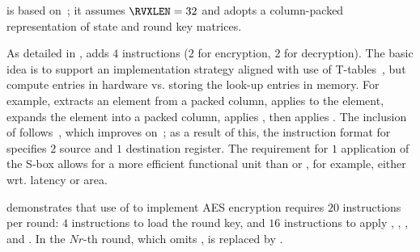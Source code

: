 
is based on~\cite{NadIkeKur:04,BBFR:06,Saarinen:20}; it
assumes 
$\RVXLEN = 32$
and adopts a 
column-packed 
representation of state and round key matrices.

As detailed in
,
adds
$ 4$
instructions ($2$ for encryption, $2$ for decryption).
The basic idea is to support an implementation strategy aligned with use
of 
T-tables~\cite[Section 4.2]{DaeRij:02}, 
but compute entries in hardware vs. storing the look-up entries in memory.
For example,
extracts                     an     element from a packed column,
 applies   to the element,
 expands                        the element into a packed column,
 applies ,
then
 applies .
The inclusion of  follows~\cite{Saarinen:20}, which
improves on~\cite{NadIkeKur:04,BBFR:06}; as a result of this,
the instruction format for
specifies $2$ source and $1$ destination register.
The requirement for $1$ application of the S-box allows for a more efficient 
functional unit than  or , for example, either wrt. latency or 
area.

demonstrates that use of  to implement AES encryption requires
$20$ instructions per round:
$ 4$            
     instructions to load the round key,
and
$16$  
     instructions to apply , , , and .
In the $Nr$-th round, which omits ,
is replaced by 
     .

